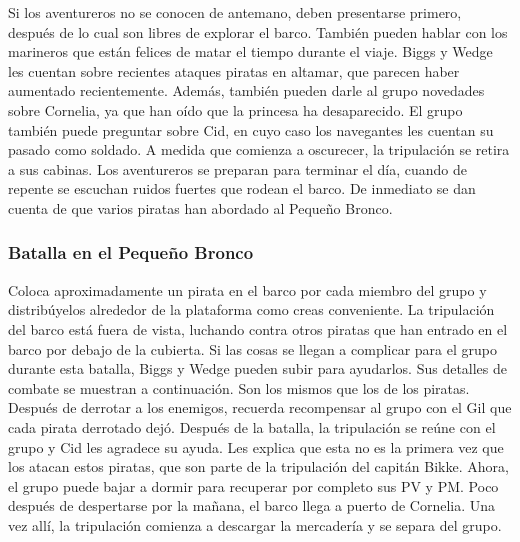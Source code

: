 Si los aventureros no se conocen de antemano, deben presentarse primero, después de lo cual son libres de explorar el barco. También pueden hablar con los marineros que están felices de matar el tiempo durante el viaje. Biggs y Wedge les cuentan sobre recientes ataques piratas en altamar, que parecen haber aumentado recientemente. Además, también pueden darle al grupo novedades sobre Cornelia, ya que han oído que la princesa ha desaparecido. El grupo también puede preguntar sobre Cid, en cuyo caso los navegantes les cuentan su pasado como soldado. A medida que comienza a oscurecer, la tripulación se retira a sus cabinas. Los aventureros se preparan para terminar el día, cuando de repente se escuchan ruidos fuertes que rodean el barco. De inmediato se dan cuenta de que varios piratas han abordado al Pequeño Bronco. \subsubsection*{Batalla en el Pequeño Bronco} Coloca aproximadamente un pirata en el barco por cada miembro del grupo y distribúyelos alrededor de la plataforma como creas conveniente. La tripulación del barco está fuera de vista, luchando contra otros piratas que han entrado en el barco por debajo de la cubierta. Si las cosas se llegan a complicar para el grupo durante esta batalla, Biggs y Wedge pueden subir para ayudarlos. Sus detalles de combate se muestran a continuación. Son los mismos que los de los piratas. Después de derrotar a los enemigos, recuerda recompensar al grupo con el Gil que cada pirata derrotado dejó. Después de la batalla, la tripulación se reúne con el grupo y Cid les agradece su ayuda. Les explica que esta no es la primera vez que los atacan estos piratas, que son parte de la tripulación del capitán Bikke. Ahora, el grupo puede bajar a dormir para recuperar por completo sus PV y PM. Poco después de despertarse por la mañana, el barco llega a puerto de Cornelia. Una vez allí, la tripulación comienza a descargar la mercadería y se separa del grupo.
%
\vspace{0.5cm}
%

%
\vspace{0.5cm}
%
